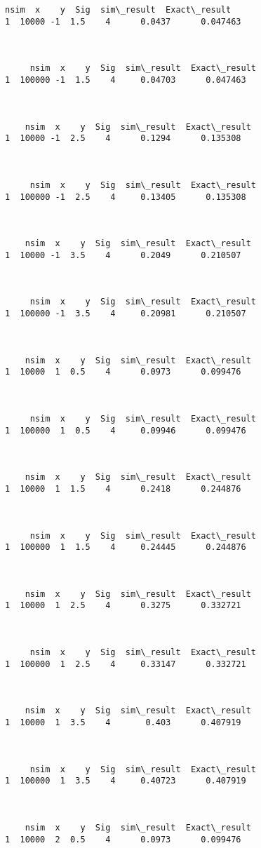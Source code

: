 \documentclass[12pt]{article}
\begin{document}
\begin{Verbatim}[commandchars=\\\{\}]
    nsim  x    y  Sig  sim\_result  Exact\_result
1  10000 -1  1.5    4      0.0437      0.047463



     nsim  x    y  Sig  sim\_result  Exact\_result
1  100000 -1  1.5    4     0.04703      0.047463



    nsim  x    y  Sig  sim\_result  Exact\_result
1  10000 -1  2.5    4      0.1294      0.135308



     nsim  x    y  Sig  sim\_result  Exact\_result
1  100000 -1  2.5    4     0.13405      0.135308



    nsim  x    y  Sig  sim\_result  Exact\_result
1  10000 -1  3.5    4      0.2049      0.210507



     nsim  x    y  Sig  sim\_result  Exact\_result
1  100000 -1  3.5    4     0.20981      0.210507



    nsim  x    y  Sig  sim\_result  Exact\_result
1  10000  1  0.5    4      0.0973      0.099476



     nsim  x    y  Sig  sim\_result  Exact\_result
1  100000  1  0.5    4     0.09946      0.099476



    nsim  x    y  Sig  sim\_result  Exact\_result
1  10000  1  1.5    4      0.2418      0.244876



     nsim  x    y  Sig  sim\_result  Exact\_result
1  100000  1  1.5    4     0.24445      0.244876



    nsim  x    y  Sig  sim\_result  Exact\_result
1  10000  1  2.5    4      0.3275      0.332721



     nsim  x    y  Sig  sim\_result  Exact\_result
1  100000  1  2.5    4     0.33147      0.332721



    nsim  x    y  Sig  sim\_result  Exact\_result
1  10000  1  3.5    4       0.403      0.407919



     nsim  x    y  Sig  sim\_result  Exact\_result
1  100000  1  3.5    4     0.40723      0.407919



    nsim  x    y  Sig  sim\_result  Exact\_result
1  10000  2  0.5    4      0.0973      0.099476




\end{Verbatim}
\end{document}
